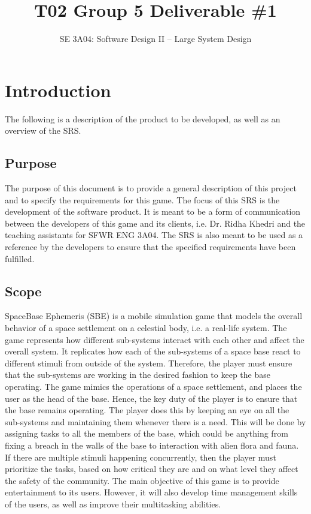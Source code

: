 \documentclass[]{article}
\title{T02 Group 5 Deliverable \#1}
\author{SE 3A04: Software Design II -- Large System Design}
\begin{document}
\maketitle	

\section{Introduction}
\label{sec:introduction}

The following is a description of the product to be developed, as well as an overview of the SRS.

\subsection{Purpose}
\label{sub:purpose}
	The purpose of this document is to provide a general description of this project and to specify the requirements for this game. The focus of this SRS is the development of the software product. It is meant to be a form of communication between the developers of this game and its clients, i.e. Dr. Ridha Khedri and the teaching assistants for SFWR ENG 3A04. The SRS is also meant to be used as a reference by the developers to ensure that the specified requirements have been fulfilled.

\subsection{Scope}
\label{sub:scope}
	SpaceBase Ephemeris (SBE) is a mobile simulation game that models the overall behavior of a space settlement on a celestial body, i.e. a real-life system. The game represents how different sub-systems interact with each other and affect the overall system. It replicates how each of the sub-systems of a space base react to different stimuli from outside of the system. Therefore, the player must ensure that the sub-systems are working in the desired fashion to keep the base operating. The game mimics the operations of a space settlement, and places the user as the head of the base. Hence, the key duty of the player is to ensure that the base remains operating. The player does this by keeping an eye on all the sub-systems and maintaining them whenever there is a need. This will be done by assigning tasks to all the members of the base, which could be anything from fixing a breach in the walls of the base to interaction with alien flora and fauna. If there are multiple stimuli happening concurrently, then the player must prioritize the tasks, based on how critical they are and on what level they affect the safety of the community. The main objective of this game is to provide entertainment to its users. However, it will also develop time management skills of the users, as well as improve their multitasking abilities. 
\end{document}
